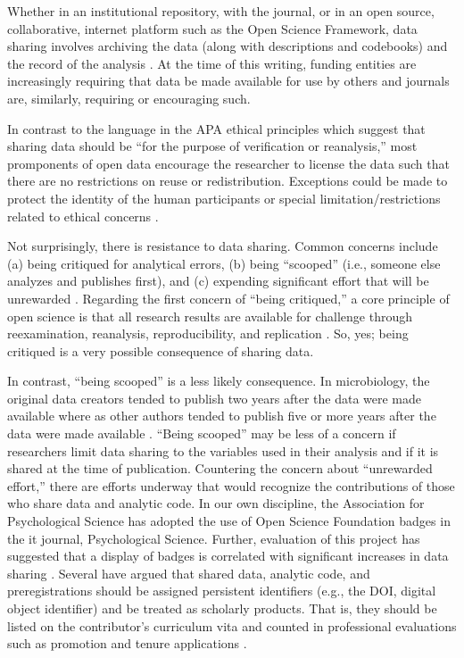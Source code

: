 \documentclass[
  11pt,
]{book}
\begin{document}
Whether in an institutional repository, with the journal, or in an open source, collaborative, internet platform such as the Open Science Framework, data sharing involves archiving the data (along with descriptions and codebooks) and the record of the analysis \citep{stevens_replicability_2017}. At the time of this writing, funding entities are increasingly requiring that data be made available for use by others \citep{ross_ethical_2018} and journals are, similarly, requiring or encouraging such.

In contrast to the language in the APA ethical principles which suggest that sharing data should be ``for the purpose of verification or reanalysis,'' most promponents of open data encourage the researcher to license the data such that there are no restrictions on reuse or redistribution. Exceptions could be made to protect the identity of the human participants or special limitation/restrictions related to ethical concerns \citep{bezjak_open_2018}.

Not surprisingly, there is resistance to data sharing. Common concerns include (a) being critiqued for analytical errors, (b) being ``scooped'' (i.e., someone else analyzes and publishes first), and (c) expending significant effort that will be unrewarded \citep{martone_data_2018}. Regarding the first concern of ``being critiqued,'' a core principle of open science is that all research results are available for challenge through reexamination, reanalysis, reproducibility, and replication \citep{alter_responsible_2018}. So, yes; being critiqued is a very possible consequence of sharing data.

In contrast, ``being scooped'' is a less likely consequence. In microbiology, the original data creators tended to publish two years after the data were made available where as other authors tended to publish five or more years after the data were made available \citep{martone_data_2018}. ``Being scooped'' may be less of a concern if researchers limit data sharing to the variables used in their analysis and if it is shared at the time of publication. Countering the concern about ``unrewarded effort,'' there are efforts underway that would recognize the contributions of those who share data and analytic code. In our own discipline, the Association for Psychological Science has adopted the use of Open Science Foundation badges in the it journal, Psychological Science. Further, evaluation of this project has suggested that a display of badges is correlated with significant increases in data sharing \citep{martone_data_2018}. Several have argued that shared data, analytic code, and preregistrations should be assigned persistent identifiers (e.g., the DOI, digital object identifier) and be treated as scholarly products. That is, they should be listed on the contributor's curriculum vita and counted in professional evaluations such as promotion and tenure applications \citep{alter_responsible_2018}.
\end{document}
